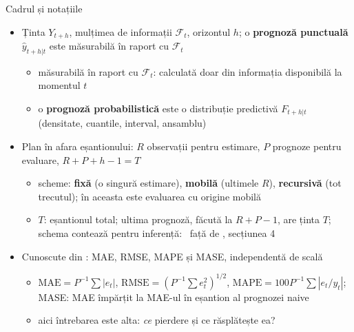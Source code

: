 \begin{frame}{Cadrul și notațiile}
\itemsize{\small}
\begin{itemize}
    \item Ținta $Y_{t+h}$, mulțimea de informații $\mathcal{F}_t$, orizontul $h$; o \textbf{prognoză punctuală} $\hat y_{t+h|t}$ este măsurabilă în raport cu $\mathcal{F}_t$
    \begin{itemize}
        \item măsurabilă în raport cu $\mathcal{F}_t$: calculată doar din informația disponibilă la momentul $t$
        \item o \textbf{prognoză probabilistică} este o distribuție predictivă $F_{t+h|t}$ (densitate, cuantile, interval, ansamblu)
    \end{itemize}
    \item Plan în afara eșantionului: $R$ observații pentru estimare, $P$ prognoze pentru evaluare, $R + P + h - 1 = T$
    \begin{itemize}
        \item scheme: \textbf{fixă} (o singură estimare), \textbf{mobilă} (ultimele $R$), \textbf{recursivă} (tot trecutul); în  aceasta este evaluarea cu origine mobilă
        \item $T$: eșantionul total; ultima prognoză, făcută la $R + P - 1$, are ținta $T$; schema contează pentru inferență: \ față de , secțiunea 4
    \end{itemize}
    \item Cunoscute din : MAE, RMSE, MAPE și MASE, independentă de scală 
    \begin{itemize}
        \item $\mathrm{MAE} = P^{-1}\sum|e_t|$, $\mathrm{RMSE} = (P^{-1}\sum e_t^2)^{1/2}$, $\mathrm{MAPE} = 100P^{-1}\sum|e_t/y_t|$; MASE: MAE împărțit la MAE-ul în eșantion al prognozei naive
        \item aici întrebarea este alta: \emph{ce} pierdere și ce răsplătește ea?
    \end{itemize}
\end{itemize}
\end{frame}

